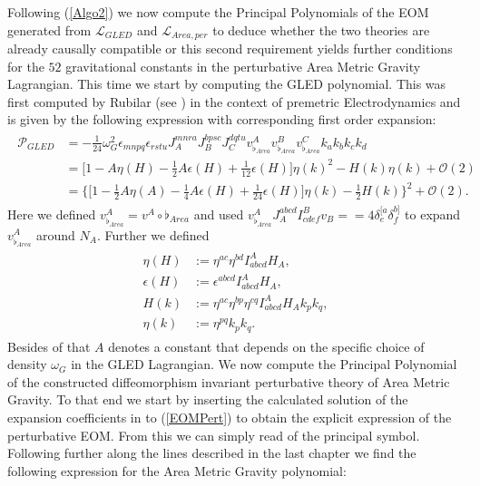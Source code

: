 \documentclass[a4paper,12pt, DIV=14, BCOR=5mm, twoside, headsepline, numbers=noenddot]{scrbook}
\begin{document}
Following (\ref{Algo2}) we now compute the Principal Polynomials of the EOM generated from $\mathcal{L}_{GLED}$ and $\mathcal{L}_{Area,per}$ to deduce whether the two theories are already causally compatible or this second requirement yields further conditions for the $52$ gravitational constants in the perturbative Area Metric Gravity Lagrangian. This time we start by computing the GLED polynomial. This was first computed by Rubilar (see \cite{2009JPhA...42U5402I}) in the context of premetric Electrodynamics and is given by the following expression with corresponding first order expansion: 
\begin{align} \label{GLEDPoly}
\begin{aligned}
    \mathcal{P}_{GLED} &= -\frac{1}{24}\omega_G^2\epsilon_{mnpq}\epsilon_{rstu}J_A^{mnra}J_B^{bpsc}J_C^{dqtu} v_{\flat_{Area}}^A v_{\flat_{Area}}^B v_{\flat_{Area}}^C k_ak_bk_ck_d \\
                &= \bigl[ 1 -  A \eta(H)- \frac{1}{2} A \epsilon(H) + \frac{1}{12} \epsilon(H) \bigr] \eta(k)^2 - H(k)\eta(k) + \mathcal{O}(2)\\
                &= \bigl\{  \bigl[ 1 - \frac{1}{2} A \eta(A) - \frac{1}{4} A \epsilon(H) +  \frac{1}{24} \epsilon(H) \bigr] \eta(k) - \frac{1}{2} H(k)       \bigr\}^2 + \mathcal{O}(2).
\end{aligned}
\end{align}
Here we defined $v_{\flat_{Area}}^A = v^A \circ \flat_{Area}$ and used $v_{\flat_{Area}}^A J_A^{abcd} I^B_{cdef}v_B = = 4 \delta^{[a}_e \delta^{b]}_f$ to expand $v^A_{\flat_{Area}}$ around $N_A$. Further we defined
\begin{align}
\begin{aligned}
\eta(H) &:= \eta^{ac}\eta^{bd} I^A_{abcd} H_A, \\ 
\epsilon(H) &:=\epsilon^{abcd}I^A_{abcd}H_{A},\\ H(k) &:=\eta^{ac}\eta^{bp}\eta^{cq} I^A_{abcd}H_Ak_pk_q, \\ \eta(k)&:=\eta^{pq}k_pk_q.
\end{aligned}
\end{align}
Besides of that $A$ denotes a constant that depends on the specific choice of density $\omega_G$ in the GLED Lagrangian.  
We now compute the Principal Polynomial of the constructed diffeomorphism invariant perturbative theory of Area Metric Gravity. To that end we start by inserting the calculated solution of the expansion coefficients in to (\ref{EOMPert}) to obtain the explicit expression of the perturbative EOM. From this we can simply read of the principal symbol. Following further along the lines described in the last chapter we find the following expression for the Area Metric Gravity polynomial:
\end{document}
